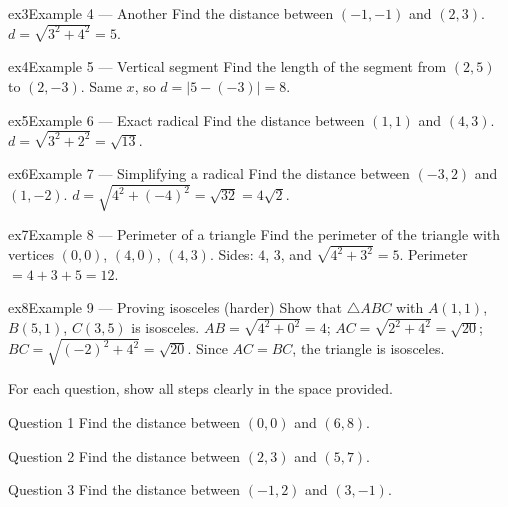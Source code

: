 \documentclass[11pt]{article}
\begin{document}
\begin{example}{ex3}{Example 4 --- Another}
Find the distance between $(-1,-1)$ and $(2,3)$.
\soln $d=\sqrt{3^2+4^2}=5.$
\end{example}

\begin{example}{ex4}{Example 5 --- Vertical segment}
Find the length of the segment from $(2,5)$ to $(2,-3)$.
\soln Same $x$, so $d=|5-(-3)|=8.$
\end{example}

\begin{example}{ex5}{Example 6 --- Exact radical}
Find the distance between $(1,1)$ and $(4,3)$.
\soln $d=\sqrt{3^2+2^2}=\sqrt{13}.$
\end{example}

\begin{example}{ex6}{Example 7 --- Simplifying a radical}
Find the distance between $(-3,2)$ and $(1,-2)$.
\soln $d=\sqrt{4^2+(-4)^2}=\sqrt{32}=4\sqrt2.$
\end{example}

\begin{example}{ex7}{Example 8 --- Perimeter of a triangle}
Find the perimeter of the triangle with vertices $(0,0)$, $(4,0)$, $(4,3)$.
\soln Sides: $4$, $3$, and $\sqrt{4^2+3^2}=5$. Perimeter $=4+3+5=12.$
\end{example}

\begin{example}{ex8}{Example 9 --- Proving isosceles (harder)}
Show that $\triangle ABC$ with $A(1,1)$, $B(5,1)$, $C(3,5)$ is isosceles.
\soln $AB=\sqrt{4^2+0^2}=4$; $AC=\sqrt{2^2+4^2}=\sqrt{20}$; $BC=\sqrt{(-2)^2+4^2}=\sqrt{20}$. Since $AC=BC$, the triangle is isosceles.
\end{example}

\clearpage
{}
For each question, show all steps clearly in the space provided.

\begin{qbox}{Question 1}
Find the distance between $(0,0)$ and $(6,8)$.\workspace{2.2cm}
\end{qbox}

\begin{qbox}{Question 2}
Find the distance between $(2,3)$ and $(5,7)$.\workspace{2.2cm}
\end{qbox}

\begin{qbox}{Question 3}
Find the distance between $(-1,2)$ and $(3,-1)$.\workspace{2.2cm}
\end{qbox}
\end{document}
